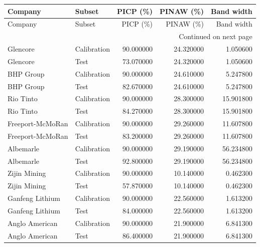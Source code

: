 \begin{longtable}{llrrr}
\toprule
Company & Subset & PICP (\%) & PINAW (\%) & Band width \\
\midrule
\endfirsthead
\toprule
Company & Subset & PICP (\%) & PINAW (\%) & Band width \\
\midrule
\endhead
\midrule
\multicolumn{5}{r}{Continued on next page} \\
\midrule
\endfoot
\bottomrule
\endlastfoot
Glencore & Calibration & 90.000000 & 24.320000 & 1.050600 \\
Glencore & Test & 73.070000 & 24.320000 & 1.050600 \\
BHP Group & Calibration & 90.000000 & 24.610000 & 5.247800 \\
BHP Group & Test & 82.670000 & 24.610000 & 5.247800 \\
Rio Tinto & Calibration & 90.000000 & 28.300000 & 15.901800 \\
Rio Tinto & Test & 84.270000 & 28.300000 & 15.901800 \\
Freeport-McMoRan & Calibration & 90.000000 & 29.260000 & 11.607800 \\
Freeport-McMoRan & Test & 83.200000 & 29.260000 & 11.607800 \\
Albemarle & Calibration & 90.000000 & 29.190000 & 56.234800 \\
Albemarle & Test & 92.800000 & 29.190000 & 56.234800 \\
Zijin Mining & Calibration & 90.000000 & 10.140000 & 0.462300 \\
Zijin Mining & Test & 57.870000 & 10.140000 & 0.462300 \\
Ganfeng Lithium & Calibration & 90.000000 & 22.560000 & 1.613200 \\
Ganfeng Lithium & Test & 84.000000 & 22.560000 & 1.613200 \\
Anglo American & Calibration & 90.000000 & 21.900000 & 6.841300 \\
Anglo American & Test & 86.400000 & 21.900000 & 6.841300 \\
\end{longtable}
